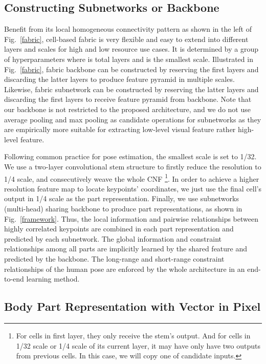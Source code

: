 \documentclass[journal]{IEEEtran}
\begin{document}
\subsection{Constructing Subnetworks or Backbone}
\label{subnet}
Benefit from its local homogeneous connectivity pattern as shown in the left of Fig.~\ref{fabric}, cell-based fabric is very flexible and easy to extend into different layers and scales for high and low resource use cases. It is determined by a group of hyperparameters  where  is total layers and  is the smallest scale. Illustrated in Fig.~\ref{fabric}, fabric backbone can be constructed by reserving the first  layers and discarding the latter  layers to produce feature pyramid in multiple scales. Likewise, fabric subnetwork can be constructed by reserving the latter  layers and discarding the first  layers to receive feature pyramid from backbone. Note that our backbone is not restricted to the proposed architecture, and we do not use  average pooling and  max pooling as candidate operations for subnetworks as they are empirically more suitable for extracting low-level visual feature rather high-level feature.

Following common practice for pose estimation, the smallest scale is set to 1/32. We use a two-layer convolutional stem structure to firstly reduce the resolution to 1/4 scale, and consecutively weave the whole CNF \footnote{For cells in first layer, they only receive the stem's output. And for cells in 1/32 scale or 1/4 scale of its current layer, it may have only have two outputs from previous cells. In this case, we will copy one of candidate inputs.}. In order to achieve a higher resolution feature map to locate keypoints' coordinates, we just use the final cell's output in 1/4 scale as the part representation.  Finally, we use  subnetworks (multi-head) sharing backbone to produce  part representations, as shown in Fig.~\ref{framework}. Thus, the local information and pairwise relationships between highly correlated keypoints are combined in each part representation and predicted by each subnetwork. The global information and constraint relationships among all parts are implicitly learned by the shared feature and predicted by the backbone. The long-range and short-range constraint relationships of the human pose are enforced by the whole architecture in an end-to-end learning method. 


\subsection{Body Part Representation with Vector in Pixel}
\label{vector in pixel}
\end{document}
